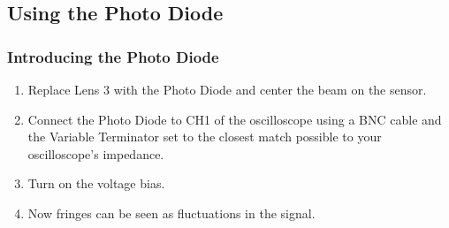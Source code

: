 \subsection{Using the Photo Diode}
\label{sec:photodiode}

    \subsubsection{Introducing the Photo Diode}
        \begin{enumerate}
        \item Replace Lens 3 with the Photo Diode and center the beam on the
        sensor.
        \item Connect the Photo Diode to CH1 of the oscilloscope using a BNC
        cable and the Variable Terminator set to the closest match possible to
        your oscilloscope's impedance.
        \item Turn on the voltage bias.
        \item Now fringes can be seen as fluctuations in the signal.
        \end{enumerate}
